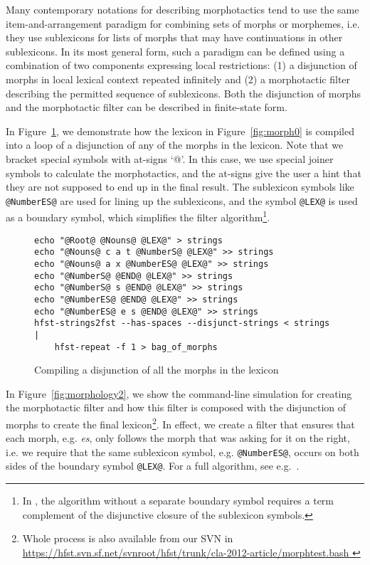 \documentclass{llncs}
\begin{document}
Many contemporary notations for describing morphotactics tend to use the same item-and-arrangement paradigm for
combining sets of morphs or morphemes, i.e. they use sublexicons for lists of morphs that may 
have continuations in other sublexicons. 
In its most general form, such a paradigm can be defined using a combination of two components expressing local restrictions:
(1) a disjunction of morphs in local lexical context repeated infinitely and 
(2) a morphotactic filter describing the permitted sequence of sublexicons.
Both the disjunction of morphs and the morphotactic filter can be described in finite-state form.

In Figure~\ref{fig:morphology1}, we demonstrate how the lexicon in
Figure~\ref{fig:morph0} is compiled into a loop of a disjunction of any of the
morphs in the lexicon. Note that we bracket special symbols with at-signs `@'. In
this case, we use special joiner symbols to calculate the morphotactics, and the
at-signs give the user a hint that they are not supposed to end up in the final
result. The sublexicon symbols like \texttt{@NumberES@} are used for lining up 
the sublexicons, and the symbol \texttt{@LEX@} is used as a boundary symbol, which simplifies the filter
algorithm\footnote{In \cite{linden/2009/sfcm}, the algorithm without a separate
boundary symbol requires a term complement of the disjunctive closure of the sublexicon
symbols.}.

\begin{figure} [h!]
{\footnotesize
\begin{verbatim}
echo "@Root@ @Nouns@ @LEX@" > strings
echo "@Nouns@ c a t @NumberS@ @LEX@" >> strings
echo "@Nouns@ a x @NumberES@ @LEX@" >> strings
echo "@NumberS@ @END@ @LEX@" >> strings
echo "@NumberS@ s @END@ @LEX@" >> strings
echo "@NumberES@ @END@ @LEX@" >> strings
echo "@NumberES@ e s @END@ @LEX@" >> strings
hfst-strings2fst --has-spaces --disjunct-strings < strings  | 
    hfst-repeat -f 1 > bag_of_morphs

\end{verbatim}
}
\caption{Compiling a disjunction of all the morphs in the lexicon}
\label{fig:morphology1}
\end{figure}

In Figure~\ref{fig:morphology2}, we show the command-line simulation for
creating the morphotactic filter and how this filter is composed with the
disjunction of morphs to create the final lexicon\footnote{Whole process is
also available from our SVN in
\url{https://hfst.svn.sf.net/svnroot/hfst/trunk/cla-2012-article/morphtest.bash
}}. In effect, we create a filter
that ensures that each morph, e.g. \emph{es}, only follows the morph that
was asking for it on the right, i.e. we require that the same sublexicon symbol, e.g. \texttt{@NumberES@},
occurs on both sides of the boundary symbol \texttt{@LEX@}. For a full algorithm, see e.g.~\cite{linden/2009/sfcm}.
\end{document}
